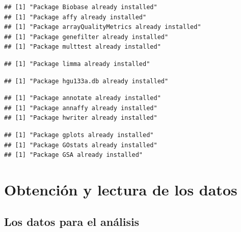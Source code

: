 \documentclass[a4paper]{article}\usepackage[]{graphicx}\usepackage[]{color}
\makeatletter
\newenvironment{kframe}{%
 \def\at@end@of@kframe{}%
 \ifinner\ifhmode%
  \def\at@end@of@kframe{\end{minipage}}%
  \begin{minipage}{\columnwidth}%
 \fi\fi%
 \def\FrameCommand##1{\hskip\@totalleftmargin \hskip-\fboxsep
 \colorbox{shadecolor}{##1}\hskip-\fboxsep
     \hskip-\linewidth \hskip-\@totalleftmargin \hskip\columnwidth}%
 \MakeFramed {\advance\hsize-\width
   \@totalleftmargin\z@ \linewidth\hsize
   \@setminipage}}%
 {\par\unskip\endMakeFramed%
 \at@end@of@kframe}
\newenvironment{knitrout}{}{} %
\makeatother
\begin{document}
\begin{knitrout}
\color{fgcolor}\begin{kframe}
\begin{verbatim}
## [1] "Package Biobase already installed"
## [1] "Package affy already installed"
## [1] "Package arrayQualityMetrics already installed"
## [1] "Package genefilter already installed"
## [1] "Package multtest already installed"
\end{verbatim}


{\ttfamily\noindent\color{warningcolor}{\#\# Warning: package 'limma' was built under R version 3.3.3}}\begin{verbatim}
## [1] "Package limma already installed"
\end{verbatim}


{\ttfamily\noindent\color{warningcolor}{\#\# Warning: package 'IRanges' was built under R version 3.3.3}}

{\ttfamily\noindent\color{warningcolor}{\#\# Warning: package 'S4Vectors' was built under R version 3.3.3}}\begin{verbatim}
## [1] "Package hgu133a.db already installed"
\end{verbatim}


{\ttfamily\noindent\color{warningcolor}{\#\# Warning: package 'XML' was built under R version 3.3.3}}\begin{verbatim}
## [1] "Package annotate already installed"
## [1] "Package annaffy already installed"
## [1] "Package hwriter already installed"
\end{verbatim}


{\ttfamily\noindent\color{warningcolor}{\#\# Warning: package 'gplots' was built under R version 3.3.3}}\begin{verbatim}
## [1] "Package gplots already installed"
## [1] "Package GOstats already installed"
## [1] "Package GSA already installed"
\end{verbatim}
\end{kframe}
\end{knitrout}


\section{Obtención y lectura de los datos}

\subsection{Los datos para el análisis}
\end{document}
